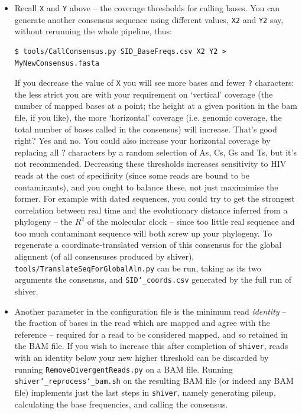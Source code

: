 \documentclass{article}
\newcommand{\shiv}{\texttt{shiver}\xspace}
\let\c\texttt
\begin{document}
\begin{itemize}

\item Recall \c{X} and \c{Y} above -- the coverage thresholds for calling bases.
You can generate another consensus sequence using different values, \c{X2} and \c{Y2} say, without rerunning the whole pipeline, thus:
\begin{Verbatim}[samepage=true]
$ tools/CallConsensus.py SID_BaseFreqs.csv X2 Y2 > MyNewConsensus.fasta
\end{Verbatim}
If you decrease the value of \c{X} you will see more bases and fewer \c{?} characters: the less strict you are with your requirement on `vertical' coverage (the number of mapped bases at a point; the height at a given position in the bam file, if you like), the more `horizontal' coverage (i.e. genomic coverage, the total number of bases called in the consensus) will increase.
That's good right?
Yes and no.
You could also increase your horizontal coverage by replacing all ? characters by a random selection of As, Cs, Gs and Ts, but it's not recommended.
Decreasing these thresholds increases sensitivity to HIV reads at the cost of specificity (since some reads are bound to be contaminants), and you ought to balance these, not just maximimise the former.
For example with dated sequences, you could try to get the strongest correlation between real time and the evolutionary distance inferred from a phylogeny -- the $R^2$ of the molecular clock -- since too little real sequence and too much contaminant sequence will both screw up your phylogeny.
To regenerate a coordinate-translated version of this consensus for the global alignnent (of all consensuses produced by shiver), \c{tools/TranslateSeqForGlobalAln.py} can be run, taking as its two arguments the consensus, and \c{SID\char`_coords.csv} generated by the full run of shiver.

\item Another parameter in the configuration file is the minimum read {\it identity} -- the fraction of bases in the read which are mapped and agree with the reference -- required for a read to be considered mapped, and so retained in the BAM file.
If you wish to increase this after completion of \shiv, reads with an identity below your new higher threshold can be discarded by running \texttt{RemoveDivergentReads.py} on a BAM file.
Running \texttt{shiver\char`_reprocess\char`_bam.sh} on the resulting BAM file (or indeed any BAM file) implements just the last steps in \shiv, namely generating pileup, calculating the base frequencies, and calling the consensus.


\end{itemize}
\end{document}
